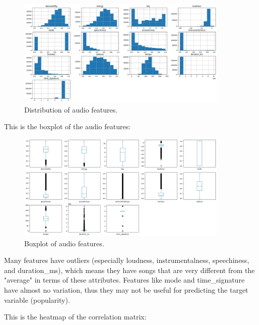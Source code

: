 \begin{figure}[h]
    \centering
    \includegraphics[width=0.9\textwidth]{media/feature_dist_cleaned.png} 
    \caption{Distribution of audio features.}
    \label{distribution}
\end{figure}

This is the boxplot of the audio features:

\begin{figure}[h]
    \centering
    \includegraphics[width=0.9\textwidth]{media/boxplot_cleaned.png} 
    \caption{Boxplot of audio features.}
    \label{boxplot}
\end{figure}


Many features have outliers (especially loudness, instrumentalness, speechiness, and duration\_ms), which means they have songs that are very different from the "average" in terms of these attributes.
Features like mode and time\_signature have almost no variation, thus they may not be useful for predicting the target variable (popularity).


\newpage

This is the heatmap of the correlation matrix:

